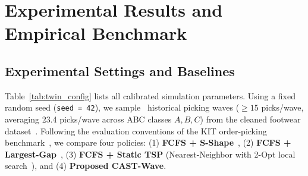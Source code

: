 \documentclass[conference]{IEEEtran}
\begin{document}
\begin{table}[t]
\centering
\caption{Digital Twin and CAST-Wave Experimental Configuration}
\label{tab:twin_config}
\end{table}



\section{Experimental Results and Empirical Benchmark}
\label{sec:experiments}

\subsection{Experimental Settings and Baselines}
\label{sec:exp_setup}
Table~\ref{tab:twin_config} lists all calibrated simulation parameters. Using a fixed random seed (\texttt{seed = 42}), we sample \BenchmarkWaves~historical picking waves ($\ge 15$ picks/wave, averaging 23.4 picks/wave across ABC classes $A, B, C$) from the cleaned footwear dataset~\cite{assis2025order}. Following the evaluation conventions of the KIT order-picking benchmark~\cite{barlang2026kit}, we compare four policies: (1) \textbf{FCFS + S-Shape}~\cite{hall1993distance}, (2) \textbf{FCFS + Largest-Gap}~\cite{hall1993distance}, (3) \textbf{FCFS + Static TSP} (Nearest-Neighbor with 2-Opt local search~\cite{roodbergen2001routing,gorener2025picker}), and (4) \textbf{Proposed CAST-Wave}.
\end{document}
